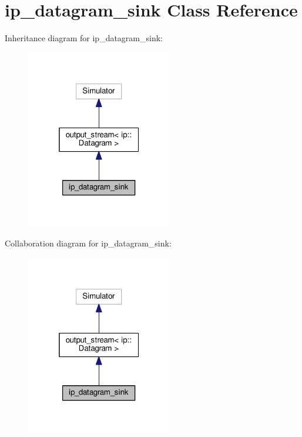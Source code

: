 \hypertarget{classip__datagram__sink}{}\section{ip\+\_\+datagram\+\_\+sink Class Reference}
\label{classip__datagram__sink}


Inheritance diagram for ip\+\_\+datagram\+\_\+sink\+:\nopagebreak
\begin{figure}[H]
\begin{center}
\leavevmode
\includegraphics[width=181pt]{classip__datagram__sink__inherit__graph}
\end{center}
\end{figure}


Collaboration diagram for ip\+\_\+datagram\+\_\+sink\+:\nopagebreak
\begin{figure}[H]
\begin{center}
\leavevmode
\includegraphics[width=181pt]{classip__datagram__sink__coll__graph}
\end{center}
\end{figure}
